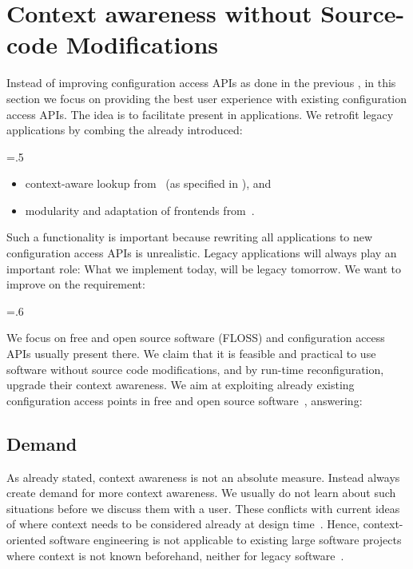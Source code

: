 \section{Context awareness without Source-code Modifications}
\label{sec:unmodified-floss}

Instead of improving configuration access APIs as done in the previous , in this section we focus on providing the best user experience with existing configuration access APIs.
The idea is to facilitate  present in applications.
We retrofit legacy applications by combing the already introduced:%
{\parfillskip=0pt \emergencystretch=.5\textwidth \par} %
\begin{itemize}
\item context-aware lookup from~ (as specified in ), and
\item modularity and adaptation of frontends from~.
\end{itemize}
Such a functionality is important because rewriting all applications to new configuration access APIs is unrealistic.
Legacy applications will always play an important role:
What we implement today, will be legacy tomorrow.
We want to improve on the requirement:%
{\parfillskip=0pt \emergencystretch=.6\textwidth \par}
\reqLegacy*

We focus on free and open source software (FLOSS) and configuration access APIs usually present there.
We claim that it is feasible and practical to use software without source code modifications, and by run-time reconfiguration, upgrade their context awareness.
We aim at exploiting already existing configuration access points in free and open source software~\cite{raab2017introducing}, answering:
\rqBackendContextUnmodified*

\subsection{Demand}

As already stated, context awareness is not an absolute measure.
Instead  always create demand for more context awareness.
We usually do not learn about such situations before we discuss them with a user.
These conflicts with current ideas of  where context needs to be considered already at design time~\cite{kamina2014context}.
Hence, context-oriented software engineering is not applicable to existing large software projects where context is not known beforehand, neither for legacy software~\cite{raab2017introducing}.

